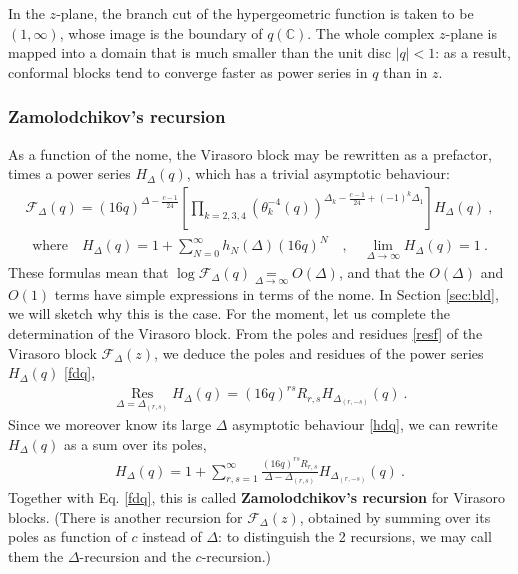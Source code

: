 \documentclass[12pt, a4paper]{article}
\newcommand{\myindex}[1]{\textbf{\boldmath #1}}
\theoremstyle{break}
\begin{document}
In the $z$-plane, the branch cut of the hypergeometric function is taken to be $(1,\infty)$, whose image is the boundary of $q(\mathbb{C})$. The whole complex $z$-plane is mapped into a domain that is much smaller than the unit disc $|q|<1$: as a result, conformal blocks tend to converge faster as power series in $q$ than in $z$.
 
\subsubsection{Zamolodchikov's recursion}\label{sec:zrr}

As a function of the nome, the Virasoro block 
may be rewritten as a prefactor, times a power series $H_\Delta(q)$, which has a trivial asymptotic behaviour:
\begin{align}
 \boxed{\mathcal{F}_\Delta(q) = (16q)^{\Delta-\frac{c-1}{24}} \left[\prod_{k=2,3,4} \left(\theta_k^{-4}(q)\right)^{\Delta_k-\frac{c-1}{24}+(-1)^k \Delta_1} \right] H_\Delta(q)}\ ,
 \label{fdq}
\end{align}
\begin{align}
 \text{where} \quad \boxed{H_\Delta(q) = 1 + \sum_{N=0}^\infty h_N(\Delta)(16q)^N}  \quad , \quad \boxed{\lim_{\Delta\to\infty} H_\Delta(q) = 1}\ . 
 \label{hdq}
\end{align}
These formulas mean that 
$\log \mathcal{F}_\Delta(q) \underset{\Delta\to\infty}{=} O(\Delta)$, and that the $O(\Delta)$ and $O(1)$ terms have simple expressions in terms of the nome. 
In Section \ref{sec:bld}, we will sketch why this is the case. For the moment, let us complete the determination of the Virasoro block.
From the poles and residues \eqref{resf} of the Virasoro block $\mathcal{F}_\Delta(z)$, we deduce the poles and residues of the power series $H_\Delta(q)$ \eqref{fdq},
\begin{align}
 \underset{\Delta=\Delta_{(r,s)}}{\operatorname{Res}} H_\Delta(q) = (16q)^{rs} R_{r,s}H_{\Delta_{(r,-s)}}(q)\ .
\end{align}
Since we moreover know its large $\Delta$ asymptotic behaviour \eqref{hdq}, we can rewrite $H_\Delta(q)$ as a sum over its poles,
\begin{align}
 \boxed{H_\Delta(q) = 1 + \sum_{r,s=1}^\infty \frac{(16q)^{rs} R_{r,s}}{\Delta-\Delta_{(r,s)}} H_{\Delta_{(r,-s)}}(q)}\ . 
 \label{hrec}
\end{align}
Together with Eq. \eqref{fdq}, this is called \myindex{Zamolodchikov's recursion} for Virasoro blocks. (There is another recursion for $\mathcal{F}_\Delta(z)$, obtained by summing over its poles as function of $c$ instead of $\Delta$: to distinguish the 2 recursions, we may call them the $\Delta$-recursion and the $c$-recursion.)
\end{document}
